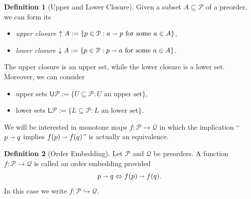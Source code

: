 \documentclass[12pt]{article}
\theoremstyle{definition}
\newtheorem{definition}{Definition}[section]
\theoremstyle{plain}
\theoremstyle{plain}
\theoremstyle{plain}
\theoremstyle{plain}
\theoremstyle{remark}
\theoremstyle{remark}
\newcommand{\mc}[1]{\mathcal{#1}}
\newcommand{\sub}{\subseteq}
\newcommand{\low}{\mathsf{L}}
\newcommand{\upper}{\mathsf{U}}
\newcommand{\upc}[1]{{\uparrow #1}}
\newcommand{\lwc}[1]{{\downarrow #1}}
\begin{document}
\begin{definition}[Upper and Lower Closure]
	Given a subset $A \sub \mc{P}$ of a preorder, we can form its
	\begin{itemize}
		\item \emph{upper closure} $\upc{A} := \{p \in \mc{P} : a \shortrightarrow p \text{ for some } a \in A\}$,
		\item \emph{lower closure} $\lwc{A} := \{p \in \mc{P} : p \shortrightarrow a \text{ for some } a \in A\}$.
	\end{itemize}
	The upper closure is an upper set, while the lower closure is a lower set. Moreover, we can consider
	\begin{itemize}
		\item upper sets $\upper\mc{P} := \{U \sub \mc{P}: U \text{ an upper set}\}$,
		\item lower sets $\low\mc{P} := \{L \sub \mc{P}: L \text{ an lower set}\}$.
	\end{itemize}
\end{definition}

We will be interested in monotone maps $f: \mc{P} \rightarrow \mc{Q}$ in which the implication ``$p \shortrightarrow q$ implies $f(p) \shortrightarrow f(q)$'' is actually an equivalence.
\begin{definition}[Order Embedding]
	Let $\mc{P}$ and $\mc{Q}$ be preorders. A function $f: \mc{P} \rightarrow \mc{Q}$ is called an order embedding provided
	$$ p \shortrightarrow q \Leftrightarrow f(p) \shortrightarrow f(q) .$$
	In this case we write $f: \mc{P} \hookrightarrow \mc{Q}$.
\end{definition}
\end{document}

